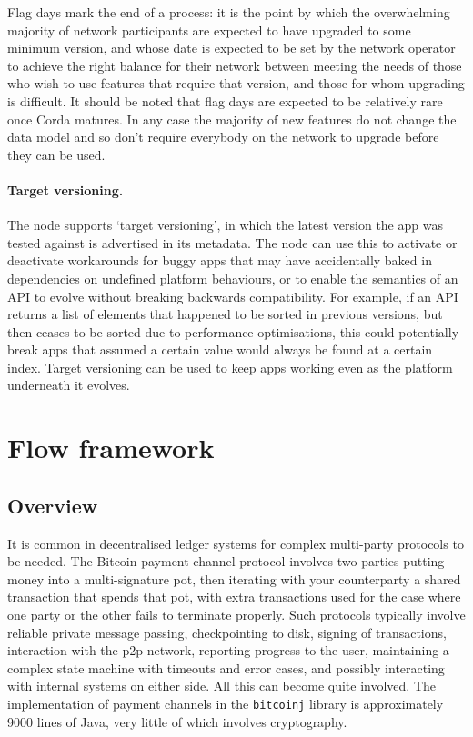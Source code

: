 \documentclass{article}
\begin{document}
Flag days mark the end of a process: it is the point by which the overwhelming majority of network participants are
expected to have upgraded to some minimum version, and whose date is expected to be set by the network operator to
achieve the right balance for their network between meeting the needs of those who wish to use features that
require that version, and those for whom upgrading is difficult. It should be noted that flag days are expected to
be relatively rare once Corda matures. In any case the majority of new features do not change the data model and so
don't require everybody on the network to upgrade before they can be used.

\paragraph{Target versioning.}The node supports `target versioning', in which the latest version the app was
tested against is advertised in its metadata. The node can use this to activate or deactivate workarounds for buggy
apps that may have accidentally baked in dependencies on undefined platform behaviours, or to enable the semantics
of an API to evolve without breaking backwards compatibility. For example, if an API returns a list of elements
that happened to be sorted in previous versions, but then ceases to be sorted due to performance optimisations,
this could potentially break apps that assumed a certain value would always be found at a certain index. Target
versioning can be used to keep apps working even as the platform underneath it evolves.

\section{Flow framework}\label{sec:flows}

\subsection{Overview}

It is common in decentralised ledger systems for complex multi-party protocols to be needed. The Bitcoin payment
channel protocol\cite{PaymentChannels} involves two parties putting money into a multi-signature pot, then
iterating with your counterparty a shared transaction that spends that pot, with extra transactions used for the
case where one party or the other fails to terminate properly. Such protocols typically involve reliable private
message passing, checkpointing to disk, signing of transactions, interaction with the p2p network, reporting
progress to the user, maintaining a complex state machine with timeouts and error cases, and possibly interacting
with internal systems on either side. All this can become quite involved. The implementation of payment channels in
the \texttt{bitcoinj} library is approximately 9000 lines of Java, very little of which involves cryptography.
\end{document}
